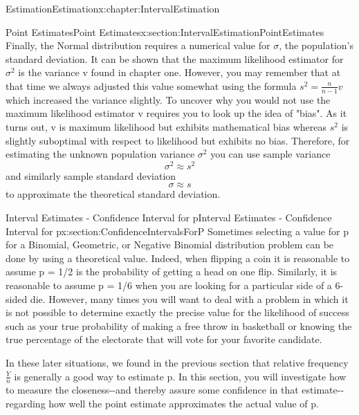 \documentclass[oneside,10pt,]{book}
\numberwithin{equation}{section}
\begin{document}
\begin{chapterptx}{Estimation}{}{Estimation}{}{}{x:chapter:IntervalEstimation}
\begin{sectionptx}{Point Estimates}{}{Point Estimates}{}{}{x:section:IntervalEstimationPointEstimates}
Finally, the Normal distribution requires a numerical value for \(\sigma\), the population's standard deviation. It can be shown that the maximum likelihood estimator for \(\sigma^2\) is the variance v found in chapter one. However, you may remember that at that time we always adjusted this value somewhat using the formula \(s^2 = \frac{n}{n-1} v\) which increased the variance slightly. To uncover why you would not use the maximum likelihood estimator v requires you to look up the idea of "bias". As it turns out, v is maximum likelihood but exhibits mathematical bias whereas \(s^2\) is slightly suboptimal with respect to likelihood but exhibits no bias. Therefore, for estimating the unknown population variance \(\sigma^2\) you can use sample variance%
\begin{equation*}
\sigma^2 \approx s^2
\end{equation*}
and similarly sample standard deviation%
\begin{equation*}
\sigma \approx s
\end{equation*}
to approximate the theoretical standard deviation.%
\end{sectionptx}
%
%
\typeout{************************************************}
\typeout{************************************************}
%
\begin{sectionptx}{Interval Estimates - Confidence Interval for p}{}{Interval Estimates - Confidence Interval for p}{}{}{x:section:ConfidenceIntervalsForP}
Sometimes selecting a value for p for a Binomial, Geometric, or Negative Binomial distribution problem can be done by using a theoretical value. Indeed, when flipping a coin it is reasonable to assume p = 1\slash{}2 is the probability of getting a head on one flip. Similarly, it is reasonable to assume p = 1\slash{}6 when you are looking for a particular side of a 6-sided die. However, many times you will want to deal with a problem in which it is not possible to determine exactly the precise value for the likelihood of success such as your true probability of making a free throw in basketball or knowing the true percentage of the electorate that will vote for your favorite candidate.%
\par
In these later situations, we found in the previous section that relative frequency \(\frac{Y}{n}\) is generally a good way to estimate p. In this section, you will investigate how to measure the closeness-{}-{}and thereby assure some confidence in that estimate-{}-{}regarding how well the point estimate approximates the actual value of p.%

\end{sectionptx}
\end{chapterptx}
\end{document}
